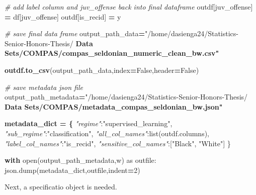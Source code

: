 \documentclass[12pt, twoside]{amherstthesis}
\newenvironment{Shaded}{\begin{snugshade}}{\end{snugshade}}
\newcommand{\BuiltInTok}[1]{#1}
\newcommand{\CommentTok}[1]{\textcolor[rgb]{0.56,0.35,0.01}{\textit{#1}}}
\newcommand{\ControlFlowTok}[1]{\textcolor[rgb]{0.13,0.29,0.53}{\textbf{#1}}}
\newcommand{\DecValTok}[1]{\textcolor[rgb]{0.00,0.00,0.81}{#1}}
\newcommand{\ErrorTok}[1]{\textcolor[rgb]{0.64,0.00,0.00}{\textbf{#1}}}
\newcommand{\ImportTok}[1]{#1}
\newcommand{\NormalTok}[1]{#1}
\newcommand{\OperatorTok}[1]{\textcolor[rgb]{0.81,0.36,0.00}{\textbf{#1}}}
\newcommand{\StringTok}[1]{\textcolor[rgb]{0.31,0.60,0.02}{#1}}
\newcommand{\VariableTok}[1]{\textcolor[rgb]{0.00,0.00,0.00}{#1}}
\begin{document}
\begin{Shaded}
\begin{Highlighting}[]
\CommentTok{\# add label column and \textasciigrave{}juv\_offense\textasciigrave{} back into final dataframe}
\NormalTok{outdf[}\StringTok{\textquotesingle{}juv\_offense\textquotesingle{}}\NormalTok{] }\OperatorTok{=}\NormalTok{ df[}\StringTok{\textquotesingle{}juv\_offense\textquotesingle{}}\NormalTok{]}
\NormalTok{outdf[}\StringTok{\textquotesingle{}is\_recid\textquotesingle{}}\NormalTok{] }\OperatorTok{=}\NormalTok{ y}

\CommentTok{\# save final data frame}
\NormalTok{output\_path\_data}\OperatorTok{=}\StringTok{"/home/dasienga24/Statistics{-}Senior{-}Honors{-}Thesis/\textquotesingle{}}
\ErrorTok{\textquotesingle{}Data Sets/COMPAS/compas\_seldonian\_numeric\_clean\_bw.csv"}

\ErrorTok{outdf.to\_csv}\NormalTok{(output\_path\_data,index}\OperatorTok{=}\VariableTok{False}\NormalTok{,header}\OperatorTok{=}\VariableTok{False}\NormalTok{)}

\CommentTok{\# save metadata json file}
\NormalTok{output\_path\_metadata}\OperatorTok{=}\StringTok{"/home/dasienga24/Statistics{-}Senior{-}Honors{-}Thesis/\textquotesingle{}}
\ErrorTok{\textquotesingle{}Data Sets/COMPAS/metadata\_compas\_seldonian\_bw.json"}

\ErrorTok{metadata\_dict = \{}
  \CommentTok{"regime"}\NormalTok{:}\StringTok{"supervised\_learning"}\NormalTok{,}
  \CommentTok{"sub\_regime"}\NormalTok{:}\StringTok{"classification"}\NormalTok{,}
  \CommentTok{"all\_col\_names"}\NormalTok{:}\BuiltInTok{list}\NormalTok{(outdf.columns),}
  \CommentTok{"label\_col\_names"}\NormalTok{:}\StringTok{"is\_recid"}\NormalTok{,}
  \CommentTok{"sensitive\_col\_names"}\NormalTok{:[}\StringTok{"Black"}\NormalTok{, }\StringTok{"White"}\NormalTok{]}
\NormalTok{\}}
    
\ControlFlowTok{with} \BuiltInTok{open}\NormalTok{(output\_path\_metadata,}\StringTok{\textquotesingle{}w\textquotesingle{}}\NormalTok{) }\ImportTok{as}\NormalTok{ outfile:}
\NormalTok{    json.dump(metadata\_dict,outfile,indent}\OperatorTok{=}\DecValTok{2}\NormalTok{)}
\end{Highlighting}
\end{Shaded}
\noindent Next, a specificatio object is needed.
\end{document}
